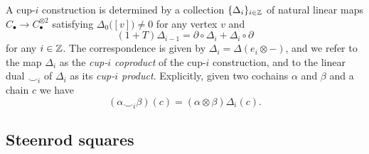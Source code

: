 A cup-$i$ construction is determined by a collection $\{\Delta_i\}_{i \in \mathbb{Z}}$ of natural linear maps $C_\bullet \to C_\bullet^{\otimes 2}$ satisfying $\Delta_0 \big([v]\big) \neq 0$ for any vertex $v$ and
\begin{equation} \label{e:boundary of cup-i}
(1 + T) \Delta_{i-1} = \partial \circ \Delta_i + \Delta_i \circ \partial
\end{equation}
for any $i \in \mathbb{Z}$.
The correspondence is given by $\Delta_i = \Delta(e_i \otimes -)$, and we refer to the map $\Delta_i$ as the \textit{cup-$i$ coproduct} of the cup-$i$ construction, and to the linear dual $\smallsmile_i$ of $\Delta_i$ as its \textit{cup-$i$ product}.
Explicitly, given two cochains $\alpha$ and $\beta$ and a chain $c$ we have
\begin{equation*}
(\alpha \smallsmile_i \beta)(c) = (\alpha \otimes \beta) \Delta_i(c).
\end{equation*}

\subsection{Steenrod squares}

